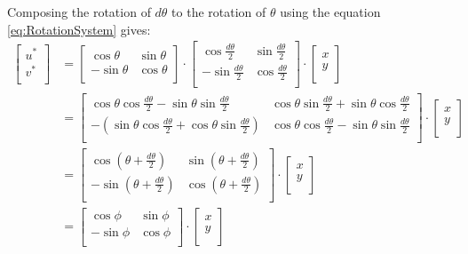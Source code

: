 \documentclass{article}
\begin{document}
Composing the rotation of $d\theta$ to the rotation of $\theta$ using the equation \eqref{eq:RotationSystem} gives:
\begin{equation} \label{eq:RotationSystemWithBlur}
\begin{aligned}
	\begin{bmatrix}
	  u^* \\
	  v^* \\
	\end{bmatrix}
	&=
	\begin{bmatrix}
	  \cos \theta & \sin \theta \\
	  -\sin \theta & \cos \theta \\
	\end{bmatrix}
\cdot
	\begin{bmatrix}
  		\cos \frac{d\theta}{2} & \sin \frac{d\theta}{2} \\
  		-\sin \frac{d\theta}{2} & \cos \frac{d\theta}{2} \\
	\end{bmatrix}
\cdot
	\begin{bmatrix}
  		x \\
  		y \\
	\end{bmatrix} \\
	&=
	\begin{bmatrix}
 		\cos \theta \cos \frac{d\theta}{2} - \sin \theta \sin \frac{d\theta}{2} & \cos \theta \sin \frac{d\theta}{2} + \sin \theta \cos \frac{d\theta}{2} \\
 		-(\sin \theta \cos \frac{d\theta}{2} + \cos \theta \sin \frac{d\theta}{2}) & \cos \theta \cos \frac{d\theta}{2} - \sin \theta \sin \frac{d\theta}{2} \\
	\end{bmatrix}
\cdot
	\begin{bmatrix}
  		x \\
  		y \\
	\end{bmatrix} \\
	&=
	\begin{bmatrix}
  		\cos(\theta + \frac{d\theta}{2}) & \sin(\theta + \frac{d\theta}{2}) \\
  		-\sin(\theta + \frac{d\theta}{2}) & \cos(\theta + \frac{d\theta}{2}) \\
	\end{bmatrix}
\cdot
	\begin{bmatrix}
  		x \\
  		y \\
	\end{bmatrix} \\
	&=
	\begin{bmatrix}
  		\cos \phi & \sin \phi \\
  		-\sin \phi & \cos \phi \\
	\end{bmatrix}
\cdot
	\begin{bmatrix}
  		x \\
  		y \\
	\end{bmatrix}
\end{aligned}
\end{equation}
\end{document}
